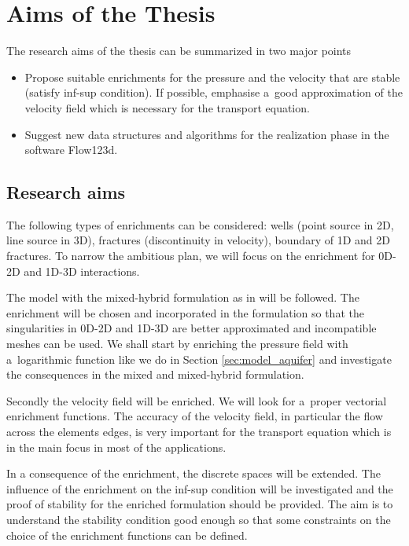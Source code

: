 \documentclass[bibliography=totocnumbered,dvipsnames,FM,Dis]{tulthesis}
\begin{document}
\section{Aims of the Thesis}\label{chap:aims}

The research aims of the thesis can be summarized in two major points
\begin{itemize}
  \item Propose suitable enrichments for the pressure and the velocity that are stable (satisfy inf-sup condition). 
        If possible, emphasise a~good approximation of the velocity field which is necessary for the transport equation.
        
  \item Suggest new data structures and algorithms for the realization phase in the software Flow123d. 
\end{itemize}

\subsection{Research aims}

The following types of enrichments can be considered: wells (point source in 2D, line source in 3D), 
fractures (discontinuity in velocity), boundary of 1D and 2D fractures. 
To narrow the ambitious plan, we will focus on the enrichment for 0D-2D and 1D-3D interactions.

The model with the mixed-hybrid formulation as in \cite{brezina_mixed-hybrid_2010, sistek_bddc_2015} will be followed.
The enrichment will be chosen and incorporated in the formulation so that the singularities in 0D-2D and
1D-3D are better approximated and incompatible meshes can be used. 
We shall start by enriching the pressure field with a~logarithmic function like we
do in Section \ref{sec:model_aquifer} and investigate the consequences in the mixed and mixed-hybrid formulation.

Secondly the velocity field will be enriched. We will look for a~proper vectorial enrichment functions.
The accuracy of the velocity field, in particular the flow across the elements edges, is very important for
the transport equation which is in the main focus in most of the applications.

In a consequence of the enrichment, the discrete spaces will be extended. The influence of the enrichment on the inf-sup 
condition will be investigated and the proof of stability for the enriched formulation should be provided.
The aim is to understand the stability condition good enough so that some constraints on the choice of the enrichment 
functions can be defined. 
\end{document}
